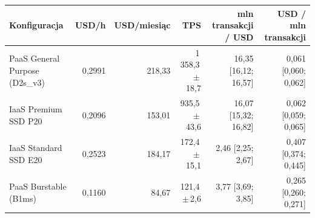 \begin{tabular}{lrrrrr}
\toprule
Konfiguracja & USD/h & USD/miesiąc & TPS & mln transakcji / USD & USD / mln transakcji \\
\midrule
PaaS General Purpose (D2s\_v3) & 0,2991 & 218,33 & 1\,358,3\,$\pm$\,18,7 & 16,35 [16,12; 16,57] & 0,061 [0,060; 0,062] \\
IaaS Premium SSD P20 & 0,2096 & 153,01 & 935,5\,$\pm$\,43,6 & 16,07 [15,32; 16,82] & 0,062 [0,059; 0,065] \\
IaaS Standard SSD E20 & 0,2523 & 184,17 & 172,4\,$\pm$\,15,1 & 2,46 [2,25; 2,67] & 0,407 [0,374; 0,445] \\
PaaS Burstable (B1ms) & 0,1160 & 84,67 & 121,4\,$\pm$\,2,6 & 3,77 [3,69; 3,85] & 0,265 [0,260; 0,271] \\
\bottomrule
\end{tabular}
